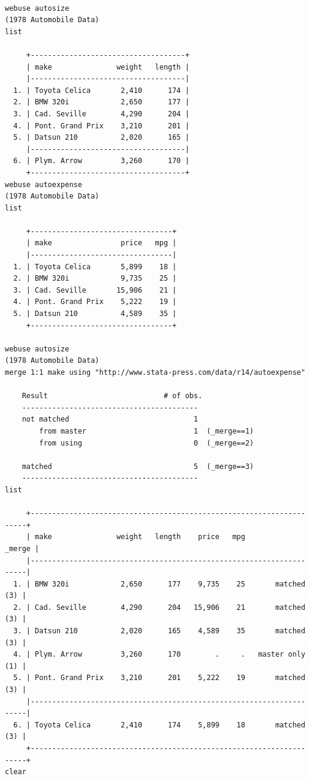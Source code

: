 \documentclass[]{book}
\begin{document}
\begin{verbatim}

webuse autosize 
(1978 Automobile Data)
list

     +------------------------------------+
     | make               weight   length |
     |------------------------------------|
  1. | Toyota Celica       2,410      174 |
  2. | BMW 320i            2,650      177 |
  3. | Cad. Seville        4,290      204 |
  4. | Pont. Grand Prix    3,210      201 |
  5. | Datsun 210          2,020      165 |
     |------------------------------------|
  6. | Plym. Arrow         3,260      170 |
     +------------------------------------+
webuse autoexpense
(1978 Automobile Data)
list

     +---------------------------------+
     | make                price   mpg |
     |---------------------------------|
  1. | Toyota Celica       5,899    18 |
  2. | BMW 320i            9,735    25 |
  3. | Cad. Seville       15,906    21 |
  4. | Pont. Grand Prix    5,222    19 |
  5. | Datsun 210          4,589    35 |
     +---------------------------------+

webuse autosize
(1978 Automobile Data)
merge 1:1 make using "http://www.stata-press.com/data/r14/autoexpense"

    Result                           # of obs.
    -----------------------------------------
    not matched                             1
        from master                         1  (_merge==1)
        from using                          0  (_merge==2)

    matched                                 5  (_merge==3)
    -----------------------------------------
list

     +---------------------------------------------------------------------+
     | make               weight   length    price   mpg            _merge |
     |---------------------------------------------------------------------|
  1. | BMW 320i            2,650      177    9,735    25       matched (3) |
  2. | Cad. Seville        4,290      204   15,906    21       matched (3) |
  3. | Datsun 210          2,020      165    4,589    35       matched (3) |
  4. | Plym. Arrow         3,260      170        .     .   master only (1) |
  5. | Pont. Grand Prix    3,210      201    5,222    19       matched (3) |
     |---------------------------------------------------------------------|
  6. | Toyota Celica       2,410      174    5,899    18       matched (3) |
     +---------------------------------------------------------------------+
clear



\end{verbatim}
\end{document}
